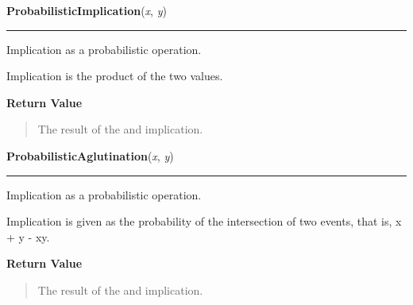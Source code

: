     \label{peach:fuzzy:norms:ProbabilisticImplication}

    \vspace{0.5ex}

    \begin{boxedminipage}{\textwidth}

    \raggedright \textbf{ProbabilisticImplication}(\textit{x}, \textit{y})

    \vspace{-1.5ex}

    \rule{\textwidth}{0.5\fboxrule}

Implication as a probabilistic operation.

Implication is the product of the two values.
    \vspace{1ex}

      \textbf{Return Value}
      \begin{quote}

The result of the and implication.
      \end{quote}

    \vspace{1ex}

    \end{boxedminipage}

    \label{peach:fuzzy:norms:ProbabilisticAglutination}

    \vspace{0.5ex}

    \begin{boxedminipage}{\textwidth}

    \raggedright \textbf{ProbabilisticAglutination}(\textit{x}, \textit{y})

    \vspace{-1.5ex}

    \rule{\textwidth}{0.5\fboxrule}

Implication as a probabilistic operation.

Implication is given as the probability of the intersection of two events,
that is, x + y - xy.
    \vspace{1ex}

      \textbf{Return Value}
      \begin{quote}

The result of the and implication.
      \end{quote}

    \vspace{1ex}

    \end{boxedminipage}


